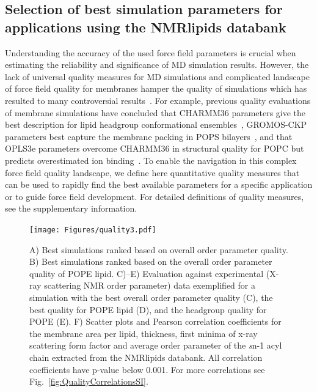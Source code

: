 \documentclass[fleqn,10pt]{wlscirep}
\begin{document}
\subsection{Selection of best simulation parameters for applications using the NMRlipids databank}
Understanding the accuracy of the used force field parameters is crucial when estimating the reliability and significance of MD simulation results. However, the lack of universal quality measures for MD simulations and complicated landscape of force field quality for membranes hamper the quality of simulations which has resulted to many controversial results~\cite{antila22b}. For example, previous quality evaluations of membrane simulations have concluded that CHARMM36 parameters give the best description for lipid headgroup conformational ensembles~\cite{bacle21}, GROMOS-CKP parameters best capture the membrane packing in POPS bilayers~\cite{antila22b}, and that OPLS3e parameters overcome CHARMM36 in structural quality for POPC but predicts overestimated ion binding~\cite{kurki22}. 
To enable the navigation in this complex force field quality landscape, we define here quantitative quality measures that can be used to rapidly find the best available parameters for a specific application or to guide force field development. For detailed definitions of quality measures, see the supplementary information.

\begin{figure}[!t]
    \centering
    \texttt{[image: Figures/quality3.pdf]}
    \caption{ A) Best simulations ranked based on overall order parameter quality.
    B) Best simulations ranked based on the overall order parameter quality of POPE lipid. 
    C)--E) Evaluation against experimental (X-ray scattering  NMR order parameter) data exemplified for a simulation with the best overall order parameter quality (C), the best quality for POPE lipid (D), and the headgroup quality for POPE (E).
    F) Scatter plots and Pearson correlation coefficients for the membrane area per lipid, thickness, first minima of x-ray scattering form factor and average order parameter of the {\textit sn}-1 acyl chain extracted from the NMRlipids databank. 
    All correlation coefficients have p-value below 0.001. For more correlations see Fig.~\ref{fig:QualityCorrelationsSI}.
    }
    \label{fig:quality}
\end{figure}
\end{document}

